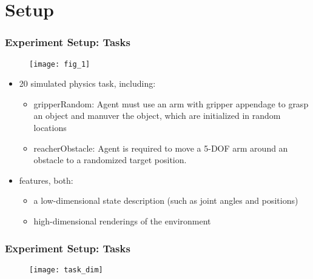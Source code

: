 \section{Setup}

\begin{frame}
\frametitle{Experiment Setup: Tasks}

\begin{figure}
    \centering
    \texttt{[image: fig\_1]}
\end{figure}

\begin{itemize}
  \item 20 simulated physics task, including:
  \begin{itemize}
    \item gripperRandom:
    Agent must use an arm with gripper appendage to grasp an object and manuver the object, which
    are initialized in random locations
    \item reacherObstacle:
    Agent is required to move a 5-DOF arm around an obstacle to a randomized target position.
  \end{itemize}
  \item features, both:
    \begin{itemize}
    \item a low-dimensional state description (such as joint angles and positions)
    \item high-dimensional renderings of the environment
  \end{itemize}
\end{itemize}

\end{frame}

\begin{frame}
\frametitle{Experiment Setup: Tasks}

\begin{figure}
    \centering
    \texttt{[image: task\_dim]}
\end{figure}

\end{frame}


